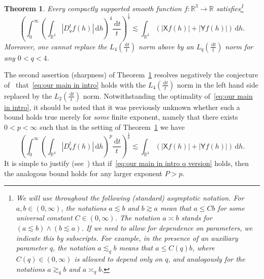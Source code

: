 \documentclass[11pt,reqno]{amsart}
\newcommand{\R}{\mathbb{R}}
\newcommand{\vv}{\mathsf{v}}
\newcommand{\XX}{\mathsf{X}}
\newcommand{\YY}{\mathsf{Y}}
\newcommand{\ud}[0]{\,\mathrm{d}}
\newcommand{\0}{\mathbf{0}}
\renewcommand{\1}{\mathbf 1}
\newcommand{\from}{\colon}
\renewcommand{\le}{\leqslant}
\newtheorem{thm}{Theorem}[section]
\theoremstyle{remark}
\begin{document}
\begin{thm}\label{thm:XYD} Every compactly supported smooth function $f\from\R^3\to \R$ satisfies\footnote{We will use throughout the following (standard) asymptotic notation. For $a,b\in (0,\infty)$, the notations
$a\lesssim b$ and $b\gtrsim a$  mean that $a\le Cb$ for some
universal constant $C\in (0,\infty)$. The notation $a\asymp b$
stands for $(a\lesssim b) \wedge  (b\lesssim a)$. If we need to allow for dependence on parameters, we indicate this by subscripts. For example, in the presence of an auxiliary parameter $q$, the notation $a\lesssim_qb$ means that $a\le C(q)b$, where $C(q)\in (0,\infty)$ is allowed to depend only on $q$, and analogously for the notations $a\gtrsim_q b$ and $a\asymp_q b$.}
\begin{equation}\label{eq:our main in intro}
\left(\int_0^\infty\left(\int_{\R^3} |D_{\vv}^tf(h)|\ud h\right)^4\!\frac{\ud t}{t}\right)^{\frac14}\lesssim \int_{\R^3} \left(|\XX f(h)|+|\YY f(h)|\right)\ud h.
\end{equation}
Moreover, one cannot replace the $L_4(\frac{\ud t}{t})$ norm above by an $L_q(\frac{\ud t}{t})$ norm for any $0<q<4$.
\end{thm}
The second assertion (sharpness) of Theorem~\ref{thm:XYD} resolves negatively the conjecture of~\cite{LafforgueNaor} that~\eqref{eq:our main in intro} holds with the $L_4(\frac{\ud t}{t})$ norm in the left hand side replaced by the $L_2(\frac{\ud t}{t})$ norm. Notwithstanding the optimality of~\eqref{eq:our main in intro}, it should be noted that  it was previously unknown whether such a bound holds true merely for {\em some} finite exponent, namely that there exists $0<p<\infty$  such that in the setting of Theorem~\ref{thm:XYD} we have
\begin{equation}\label{eq:our main in intro q version}
\left(\int_0^\infty\left(\int_{\R^3} |D_{\vv}^tf(h)|\ud h\right)^p\!\frac{\ud t}{t}\right)^{\frac1{p}}\lesssim \int_{\R^3} \left(|\mathbf{\XX} f(h)|+|\YY f(h)|\right)\ud h.
\end{equation}
It is simple to justify (see~\cite[Remark~4]{NY18}) that if~\eqref{eq:our main in intro q version} holds, then the analogous bound  holds for any larger exponent $P>p$.
\end{document}
